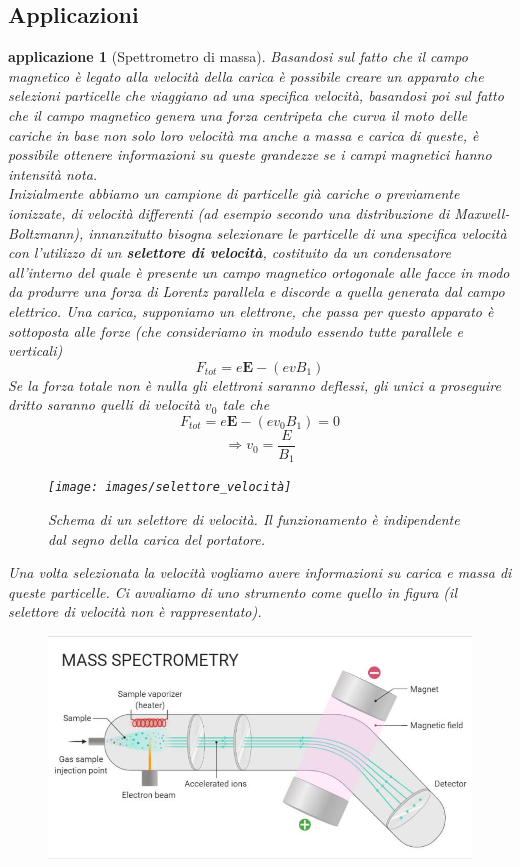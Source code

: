 \documentclass[10pt,a4paper]{article}
\newtheorem{applicazione}{applicazione}
\begin{document}
\subsection{Applicazioni}
\begin{applicazione}[Spettrometro di massa]
Basandosi sul fatto che il campo magnetico è legato alla velocità della carica è possibile creare un apparato che selezioni particelle che viaggiano ad una specifica velocità, basandosi poi sul fatto che il campo magnetico genera una forza centripeta che curva il moto delle cariche in base non solo loro velocità ma anche a massa e carica di queste, è possibile ottenere informazioni su queste grandezze se i campi magnetici hanno intensità nota.\\
Inizialmente abbiamo un campione di particelle già cariche o previamente ionizzate, di velocità differenti (ad esempio secondo una distribuzione di Maxwell-Boltzmann), innanzitutto bisogna selezionare le particelle di una specifica velocità con l'utilizzo di un \textbf{selettore di velocità}, costituito da un condensatore all'interno del quale è presente un campo magnetico ortogonale alle facce in modo da produrre una forza di Lorentz  parallela e discorde a quella generata dal campo elettrico. Una carica, supponiamo un elettrone, che passa per questo apparato è sottoposta alle forze (che consideriamo in modulo essendo tutte parallele e verticali)
\[F_{tot} = e\mathbf{E}-(evB_1)\]
Se la forza totale non è nulla gli elettroni saranno deflessi, gli unici a proseguire dritto saranno quelli di velocità \(v_0\) tale che
\[F_{tot}= e\mathbf{E}-(ev_0B_1)=0\]
\[\Rightarrow v_0=\frac{E}{B_1}\]
\begin{figure}[h!]
	\centering
	\texttt{[image: images/selettore\_velocità]}
	\caption{Schema di un selettore di velocità. Il funzionamento è indipendente dal segno della carica del portatore.}
	\label{fig:selettorevelocita}
\end{figure}
\FloatBarrier
Una volta selezionata la velocità vogliamo avere informazioni su carica e massa di queste particelle. Ci avvaliamo di uno strumento come quello in figura (il selettore di velocità non è rappresentato).
\begin{figure}[h!]
	\centering
	\includegraphics[width=0.7\linewidth]{images/spettrometro}

\end{figure}
\end{applicazione}
\end{document}
